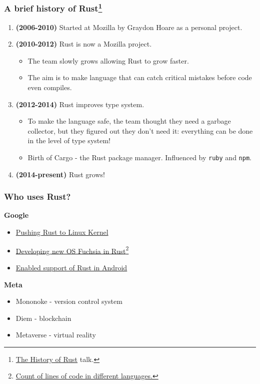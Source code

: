 \documentclass[aspectratio=1610,t]{beamer}
\begin{document}
\begin{frame}
\frametitle{A brief history of Rust\footnote{\href{https://www.youtube.com/watch?v=79PSagCD_AY}{The History of Rust} talk.}}

\begin{enumerate}
    \item \textbf{(2006-2010)} Started at Mozilla by Graydon Hoare as a personal project.
    \item \textbf{(2010-2012)} Rust is now a Mozilla project.
    \begin{itemize}
        \item The team slowly grows allowing Rust to grow faster.
        \item The aim is to make language that can catch critical mistakes before code even compiles.
    \end{itemize}
    \item \textbf{(2012-2014)} Rust improves type system.
    \begin{itemize}
        \item To make the language safe, the team thought they need a garbage collector, but they figured out they don't need it: everything can be done in the level of type system!
        \item Birth of Cargo - the Rust package manager. Influenced by \texttt{ruby} and \texttt{npm}.
    \end{itemize}
    \item \textbf{(2014-present)} Rust grows!
\end{enumerate}
\end{frame}


\begin{frame}
\frametitle{Who uses Rust?}
\textbf{Google}

\begin{itemize}
    \item \href{https://security.googleblog.com/2021/04/rust-in-linux-kernel.html}{Pushing Rust to Linux Kernel}
    \item \href{https://fuchsia.dev/fuchsia-src/development/languages/rust}{Developing new OS Fuchsia in Rust}\footnote{\href{https://imgur.com/gknVmYk}{Count of lines of code in different languages.}}
    \item \href{https://security.googleblog.com/2021/04/rust-in-android-platform.html}{Enabled support of Rust in Android}
\end{itemize}

\textbf{Meta} 

\begin{itemize}
    \item Mononoke - version control system
    \item Diem - blockchain
    \item Metaverse - virtual reality
\end{itemize}
\end{frame}
\end{document}
